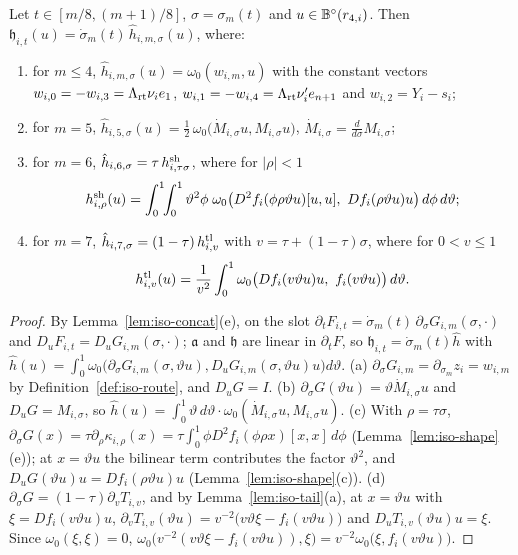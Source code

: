 \begin{lemma}\label{lem:iso-stage-primitives}
Let $t\in[m/8,(m+1)/8]$, $\sigma=\sigma_m(t)$ and $u\in\mathbb{B}^\circ(r_{4,i})$. Then
$\mathfrak h_{i,t}(u)=\dot\sigma_m(t)\,\hat h_{i,m,\sigma}(u)$, where:
\begin{enumerate}[label=(\alph*)]
\item for $m\le4$, $\hat h_{i,m,\sigma}(u)=\omega_0(w_{i,m},u)$ with the constant vectors
 $w_{i,0}=-w_{i,3}=\Lambda_{\rm rt}\nu_ie_1$, $w_{i,1}=-w_{i,4}=\Lambda_{\rm rt}\nu'_ie_{n+1}$ and $w_{i,2}=Y_i-s_i$;
\item for $m=5$, $\hat h_{i,5,\sigma}(u)=\tfrac12\,\omega_0\big(\dot M_{i,\sigma}u,M_{i,\sigma}u\big)$, $\dot M_{i,\sigma}=\frac{d}{d\sigma}M_{i,\sigma}$;
\item for $m=6$, $\hat h_{i,6,\sigma}=\tau\,h^{\rm sh}_{i,\tau\sigma}$, where for $|\rho|<1$
 \[
  h^{\rm sh}_{i,\rho}(u)=\int_0^1\!\!\int_0^1\vartheta^2\phi\;
  \omega_0\big(D^2f_i(\phi\rho\vartheta u)[u,u],\ Df_i(\rho\vartheta u)u\big)\,d\phi\,d\vartheta ;
 \]
\item for $m=7$, $\hat h_{i,7,\sigma}=(1-\tau)\,h^{\rm tl}_{i,v}$ with $v=\tau+(1-\tau)\sigma$, where for $0<v\le1$
 \[
  h^{\rm tl}_{i,v}(u)=\frac1{v^2}\int_0^1\omega_0\big(Df_i(v\vartheta u)u,\ f_i(v\vartheta u)\big)\,d\vartheta .
 \]
\end{enumerate}
\end{lemma}

\begin{proof}
By Lemma~\ref{lem:iso-concat}(e), on the slot $\partial_tF_{i,t}=\dot\sigma_m(t)\,\partial_\sigma G_{i,m}(\sigma,\cdot)$ and
$D_uF_{i,t}=D_uG_{i,m}(\sigma,\cdot)$; $\mathfrak a$ and $\mathfrak h$ are linear in $\partial_tF$, so
$\mathfrak h_{i,t}=\dot\sigma_m(t)\hat h$ with $\hat h(u)=\int_0^1\omega_0\big(\partial_\sigma G_{i,m}(\sigma,\vartheta u),D_uG_{i,m}(\sigma,\vartheta u)u\big)d\vartheta$.
(a) $\partial_\sigma G_{i,m}=\partial_{\sigma_m}z_i=w_{i,m}$ by Definition~\ref{def:iso-route}, and $D_uG=I$.
(b) $\partial_\sigma G(\vartheta u)=\vartheta\dot M_{i,\sigma}u$ and $D_uG=M_{i,\sigma}$, so
$\hat h(u)=\int_0^1\vartheta\,d\vartheta\cdot\omega_0(\dot M_{i,\sigma}u,M_{i,\sigma}u)$.
(c) With $\rho=\tau\sigma$, $\partial_\sigma G(x)=\tau\partial_\rho\kappa_{i,\rho}(x)=\tau\int_0^1\phi D^2f_i(\phi\rho x)[x,x]\,d\phi$
(Lemma~\ref{lem:iso-shape}(e)); at $x=\vartheta u$ the bilinear term contributes the factor $\vartheta^2$, and
$D_uG(\vartheta u)u=Df_i(\rho\vartheta u)u$ (Lemma~\ref{lem:iso-shape}(c)).
(d) $\partial_\sigma G=(1-\tau)\partial_vT_{i,v}$, and by Lemma~\ref{lem:iso-tail}(a), at $x=\vartheta u$ with $\xi=Df_i(v\vartheta u)u$,
$\partial_vT_{i,v}(\vartheta u)=v^{-2}\big(v\vartheta\xi-f_i(v\vartheta u)\big)$ and $D_uT_{i,v}(\vartheta u)u=\xi$. Since $\omega_0(\xi,\xi)=0$,
$\omega_0\big(v^{-2}(v\vartheta\xi-f_i(v\vartheta u)),\xi\big)=v^{-2}\omega_0\big(\xi,f_i(v\vartheta u)\big)$.
\end{proof}

